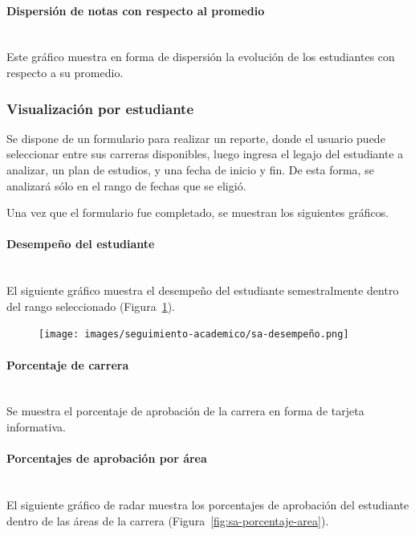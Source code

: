 \paragraph{Dispersión de notas con respecto al promedio} \mbox{}\\
Este gráfico muestra en forma de dispersión la evolución de los estudiantes con respecto a su promedio.

\subsubsection{Visualización por estudiante}
Se dispone de un formulario para realizar un reporte, donde el usuario puede seleccionar entre sus carreras disponibles, luego ingresa el legajo del estudiante a analizar, un plan de estudios, y una fecha de inicio y fin. De esta forma, se analizará sólo en el rango de fechas que se eligió.

Una vez que el formulario fue completado, se muestran los siguientes gráficos.

\paragraph{Desempeño del estudiante} \mbox{}\\
El siguiente gráfico muestra el desempeño del estudiante semestralmente dentro del rango seleccionado  (Figura~\ref{fig:sa-detalle-aprobacion}).
\begin{figure}[H]
  \centering
    \texttt{[image: images/seguimiento-academico/sa-desempeño.png]}
  \label{fig:sa-detalle-aprobacion}
\end{figure}

\paragraph{Porcentaje de carrera} \mbox{}\\
Se muestra el porcentaje de aprobación de la carrera en forma de tarjeta informativa.

\paragraph{Porcentajes de aprobación por área} \mbox{}\\
El siguiente gráfico de radar muestra los porcentajes de aprobación del estudiante dentro de las áreas de la carrera (Figura~\ref{fig:sa-porcentaje-area}).

